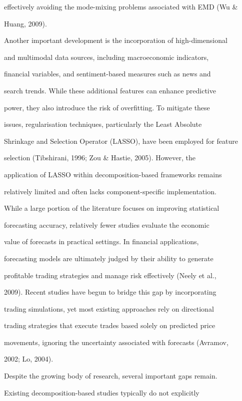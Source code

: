 effectively avoiding the mode-mixing problems associated with EMD (Wu \&

Huang, 2009).



Another important development is the incorporation of high-dimensional

and multimodal data sources, including macroeconomic indicators,

financial variables, and sentiment-based measures such as news and

search trends. While these additional features can enhance predictive

power, they also introduce the risk of overfitting. To mitigate these

issues, regularisation techniques, particularly the Least Absolute

Shrinkage and Selection Operator (LASSO), have been employed for feature

selection (Tibshirani, 1996; Zou \& Hastie, 2005). However, the

application of LASSO within decomposition-based frameworks remains

relatively limited and often lacks component-specific implementation.



While a large portion of the literature focuses on improving statistical

forecasting accuracy, relatively fewer studies evaluate the economic

value of forecasts in practical settings. In financial applications,

forecasting models are ultimately judged by their ability to generate

profitable trading strategies and manage risk effectively (Neely et al.,

2009). Recent studies have begun to bridge this gap by incorporating

trading simulations, yet most existing approaches rely on directional

trading strategies that execute trades based solely on predicted price

movements, ignoring the uncertainty associated with forecasts (Avramov,

2002; Lo, 2004).



Despite the growing body of research, several important gaps remain.

Existing decomposition-based studies typically do not explicitly

